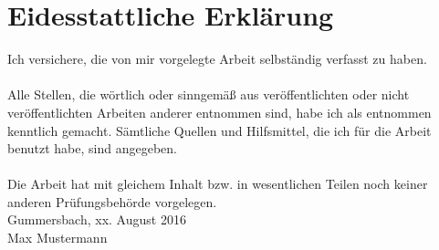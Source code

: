 \chapter*{Eidesstattliche Erklärung}

Ich versichere, die von mir vorgelegte Arbeit selbständig verfasst zu haben.\\ \\
Alle Stellen, die wörtlich oder sinngemäß aus veröffentlichten oder nicht veröffentlichten Arbeiten anderer entnommen sind, habe ich als entnommen kenntlich gemacht. Sämtliche Quellen und Hilfsmittel, die ich für die Arbeit benutzt habe, sind angegeben.\\ \\
Die Arbeit hat mit gleichem Inhalt bzw. in wesentlichen Teilen noch keiner anderen Prüfungsbehörde vorgelegen.
\vspace{1.5cm}
\\
Gummersbach, xx. August 2016
\vspace{3cm}
\\
Max Mustermann


